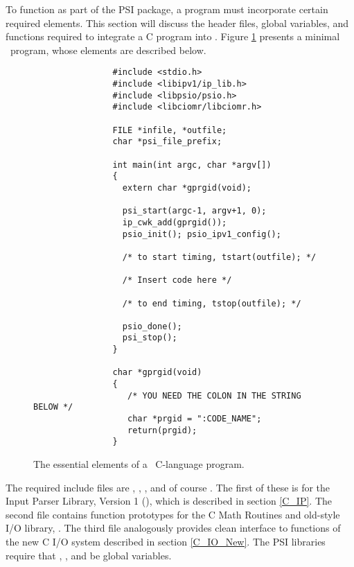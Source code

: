 %
%
%
%

To function as part of the PSI package, a program must incorporate
certain required elements.  This section will discuss the header
files, global variables, and functions required to integrate a C
program into \PSIthree.  Figure \ref{fig:Essential_C_Program} presents
a minimal \PSIthree\ program, whose elements are described below.

\begin{figure}
\begin{verbatim}
                #include <stdio.h>
                #include <libipv1/ip_lib.h>
                #include <libpsio/psio.h>
                #include <libciomr/libciomr.h>

                FILE *infile, *outfile;
                char *psi_file_prefix;

                int main(int argc, char *argv[])
                {
                  extern char *gprgid(void);

                  psi_start(argc-1, argv+1, 0);
                  ip_cwk_add(gprgid());
                  psio_init(); psio_ipv1_config();

                  /* to start timing, tstart(outfile); */
                
                  /* Insert code here */

                  /* to end timing, tstop(outfile); */

                  psio_done();
                  psi_stop();
                }

                char *gprgid(void)
                {
                   /* YOU NEED THE COLON IN THE STRING BELOW */
                   char *prgid = ":CODE_NAME";
                   return(prgid);
                }               
\end{verbatim}
\caption{The essential elements of a \PSIthree\ C-language program.}
\label{fig:Essential_C_Program}
\end{figure}

The required include files are ,
, , and of course
.  The first of these is for the Input Parser Library,
Version 1 (), which is described in section
\ref{C_IP}.  The second file contains function prototypes for the C
Math Routines and old-style I/O library, .  The third
file analogously provides clean interface to functions of the new C
I/O system described in section \ref{C_IO_New}.  The PSI libraries
require that , , and
 be global variables.  

